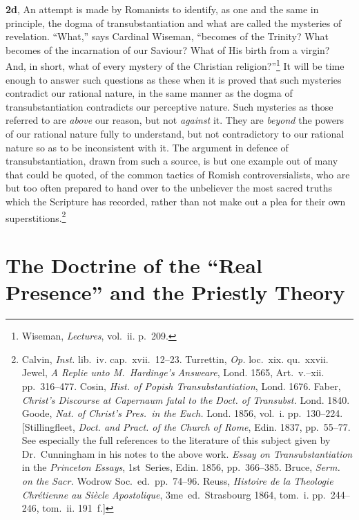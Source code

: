 \documentclass[
  english,
]{book}
\newcommand{\textfrench}[2][]{\foreignlanguage{french}{#2}}
\begin{document}
\textbf{2d}, An attempt is made by Romanists to identify, as one and the same in principle, the dogma of transubstantiation and what are called the mysteries of revelation. ``What,'' says Cardinal Wiseman, ``becomes of the Trinity? What becomes of the incarnation of our Saviour? What of His birth from a virgin? And, in short, what of every mystery of the Christian religion?''\footnote{Wiseman, \emph{Lectures}, vol.~ii. p.~209.} It will be time enough to answer such questions as these when it is proved that such mysteries contradict our rational nature, in the same manner as the dogma of transubstantiation contradicts our perceptive nature. Such mysteries as those referred to are \emph{above} our reason, but not \emph{against} it. They are \emph{beyond} the powers of our rational nature fully to understand, but not contradictory to our rational nature so as to be inconsistent with it. The argument in defence of transubstantiation, drawn from such a source, is but one example out of many that could be quoted, of the common tactics of Romish controversialists, who are but too often prepared to hand over to the unbeliever the most sacred truths which the Scripture has recorded, rather than not make out a plea for their own superstitions.\footnote{Calvin, \emph{Inst.} lib.~iv. cap.~xvii.~12--23. Turrettin, \emph{Op.} loc.~xix. qu.~xxvii. Jewel, \emph{A Replie unto M.~Hardinge's Answeare}, Lond. 1565, Art.~v.--xii. pp.~316--477. Cosin, \emph{Hist. of Popish Transubstantiation}, Lond. 1676. Faber, \emph{Christ's Discourse at Capernaum fatal to the Doct. of Transubst.} Lond. 1840. Goode, \emph{Nat. of Christ's Pres.~in the Euch.} Lond. 1856, vol.~i. pp.~130--224. {[}Stillingfleet, \emph{Doct. and Pract. of the Church of Rome}, Edin. 1837, pp.~55--77. See especially the full references to the literature of this subject given by Dr.~Cunningham in his notes to the above work. \emph{Essay on Transubstantiation} in the \emph{Princeton Essays}, 1st~Series, Edin. 1856, pp.~366--385. Bruce, \emph{Serm. on the Sacr.} Wodrow Soc.~ed.~pp.~74--96. Reuss, \textfrench{\emph{Histoire de la Theologie Chrétienne au Siècle Apostolique}}, 3me~ed.~Strasbourg 1864, tom.~i. pp.~244--246, tom.~ii. 191~f.{]}}

\hypertarget{the-doctrine-of-the-real-presence-and-the-priestly-theory}{%
\section{The Doctrine of the ``Real Presence'' and the Priestly Theory}\label{the-doctrine-of-the-real-presence-and-the-priestly-theory}}
\end{document}
